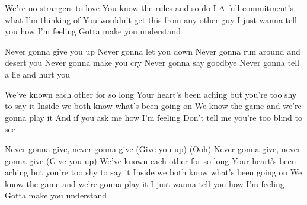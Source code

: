 \begin{verse*}
We're no strangers to love
You know the rules and so do I
A full commitment's what I'm thinking of
You wouldn't get this from any other guy
I just wanna tell you how I'm feeling
Gotta make you understand
\end{verse*}

\begin{chorus}
Never gonna give you up
Never gonna let you down
Never gonna run around and desert you
Never gonna make you cry
Never gonna say goodbye
Never gonna tell a lie and hurt you
\end{chorus}

\begin{verse*}
We've known each other for so long
Your heart's been aching but you're too shy to say it
Inside we both know what's been going on
We know the game and we're gonna play it
And if you ask me how I'm feeling
Don't tell me you're too blind to see
\end{verse*}

\thechorus[2]

\begin{verse*}
Never gonna give, never gonna give
(Give you up)
(Ooh) Never gonna give, never gonna give
(Give you up)
We've known each other for so long
Your heart's been aching but you're too shy to say it
Inside we both know what's been going on
We know the game and we're gonna play it
I just wanna tell you how I'm feeling
Gotta make you understand
\end{verse*}
